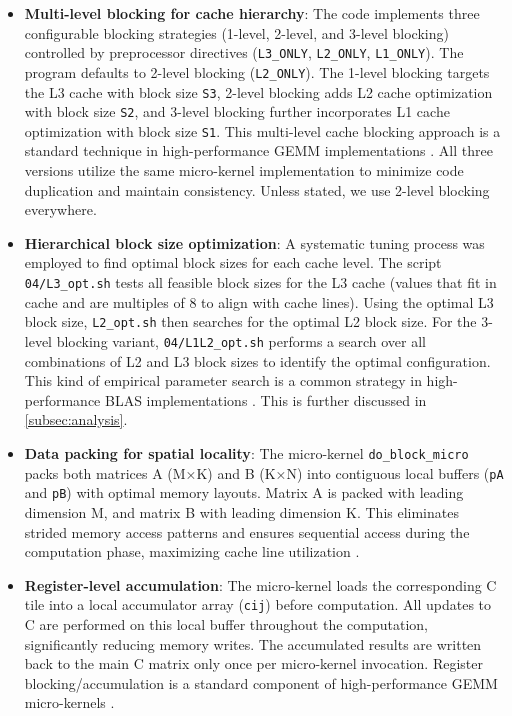 \documentclass[unicode,10pt,a4paper,oneside,numbers=endperiod,openany]{scrartcl}
\begin{document}
\begin{itemize}
  \item \textbf{Multi-level blocking for cache hierarchy}: The code implements three configurable blocking strategies (1-level, 2-level, and 3-level blocking) controlled by preprocessor directives (\verb|L3_ONLY|, \verb|L2_ONLY|, \verb|L1_ONLY|). The program defaults to 2-level blocking (\verb|L2_ONLY|). The 1-level blocking targets the L3 cache with block size \verb|S3|, 2-level blocking adds L2 cache optimization with block size \verb|S2|, and 3-level blocking further incorporates L1 cache optimization with block size \verb|S1|. This multi-level cache blocking approach is a standard technique in high-performance GEMM implementations \cite{goto_gemm,blis_toms}. All three versions utilize the same micro-kernel implementation to minimize code duplication and maintain consistency. Unless stated, we use 2-level blocking everywhere.

    \item \textbf{Hierarchical block size optimization}: A systematic tuning process was employed to find optimal block sizes for each cache level. The script \verb|04/L3_opt.sh| tests all feasible block sizes for the L3 cache (values that fit in cache and are multiples of 8 to align with cache lines). Using the optimal L3 block size, \verb|L2_opt.sh| then searches for the optimal L2 block size. For the 3-level blocking variant, \verb|04/L1L2_opt.sh| performs a search over all combinations of L2 and L3 block sizes to identify the optimal configuration. This kind of empirical parameter search is a common strategy in high-performance BLAS implementations \cite{atlas}. This is further discussed in \ref{subsec:analysis}.

    \item \textbf{Data packing for spatial locality}: The micro-kernel \verb|do_block_micro| packs both matrices A (M×K) and B (K×N) into contiguous local buffers (\verb|pA| and \verb|pB|) with optimal memory layouts. Matrix A is packed with leading dimension M, and matrix B with leading dimension K. This eliminates strided memory access patterns and ensures sequential access during the computation phase, maximizing cache line utilization \cite{goto_gemm,blis_toms}.

    \item \textbf{Register-level accumulation}: The micro-kernel loads the corresponding C tile into a local accumulator array (\verb|cij|) before computation. All updates to C are performed on this local buffer throughout the computation, significantly reducing memory writes. The accumulated results are written back to the main C matrix only once per micro-kernel invocation. Register blocking/accumulation is a standard component of high-performance GEMM micro-kernels \cite{goto_gemm,blis_toms}.


\end{itemize}
\end{document}
